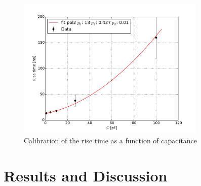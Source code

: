 \documentclass[12pt]{article}
\begin{document}

\begin{figure}[htb]
  \centering
  \includegraphics[width=0.8\textwidth]{./graphics/calibration_diode}
  \caption{Calibration of the rise time as a function of capacitance} %
  \label{fig:RiseTime_vs_Capacitance}
\end{figure}

\section{Results and Discussion}
\end{document}
